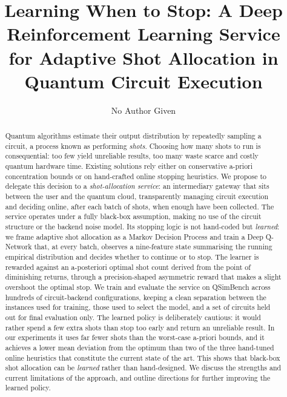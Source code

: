 \documentclass[runningheads]{llncs}
\begin{document}
\title{Learning When to Stop: A Deep Reinforcement Learning Service\\ for Adaptive Shot Allocation in Quantum Circuit Execution}

\author{No Author Given}


\maketitle

\begin{abstract}
Quantum algorithms estimate their output distribution by repeatedly sampling a
circuit, a process known as performing \emph{shots}. Choosing how many shots to
run is consequential: too few yield unreliable results, too many waste scarce
and costly quantum hardware time. Existing solutions rely either on conservative
a-priori concentration bounds or on hand-crafted online stopping heuristics. We propose to delegate this decision to a \emph{shot-allocation service}: an
intermediary gateway that sits between the user and the quantum cloud,
transparently managing circuit execution and deciding online, after each batch
of shots, when enough have been collected. The service operates under a fully
black-box assumption, making no use of the circuit structure or the backend
noise model. Its stopping logic is not hand-coded but \emph{learned}: we frame
adaptive shot allocation as a Markov Decision Process and train a Deep Q-Network
that, at every batch, observes a nine-feature state summarising the running
empirical distribution and decides whether to continue or to stop. The learner is
rewarded against an a-posteriori optimal shot count derived from the point of
diminishing returns, through a precision-shaped asymmetric reward that makes a
slight overshoot the optimal stop. We train and evaluate the service on
QSimBench across hundreds of circuit-backend configurations, keeping a clean
separation between the instances used for training, those used to select the
model, and a set of circuits held out for final evaluation only. The learned
policy is deliberately cautious: it would rather spend a few extra shots than
stop too early and return an unreliable result. In our experiments it uses far
fewer shots than the worst-case a-priori bounds, and it achieves a lower mean
deviation from the optimum than two of the three hand-tuned online heuristics
that constitute the current state of the art. This shows that black-box shot
allocation can be \emph{learned} rather than hand-designed. We discuss the
strengths and current limitations of the approach, and outline directions for
further improving the learned policy.

\end{abstract}
\end{document}
